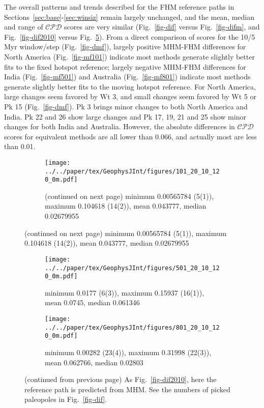 The overall patterns and trends described for the FHM reference paths in
Sections~\ref{sec:base}-\ref{sec:winsiz} remain largely unchanged, and the mean,
median and range of $\mathcal{CPD}$ scores are very similar (Fig.~\ref{fig-dif}
versus Fig.~\ref{fig-difm}, and Fig.~\ref{fig-dif2010} versus
Fig.~\ref{fig-dif2010m}). From a direct comparison of scores for the 10/5 Myr
window/step (Fig.~\ref{fig-dmf}), largely positive MHM-FHM differences for North
America (Fig.~\ref{fig-mf101}) indicate most methods generate slightly better
fits to the fixed hotspot reference; largely negative MHM-FHM differences for
India (Fig.~\ref{fig-mf501}) and Australia (Fig.~\ref{fig-mf801}) indicate most
methods generate slightly better fits to the moving hotspot reference. For North
America, large changes seem favored by Wt 3, and small changes seem favored by
Wt 5 or Pk 15 (Fig.~\ref{fig-dmf}). Pk 3 brings minor changes to both North
America and India. Pk 22 and 26 show large changes and Pk 17, 19, 21 and 25 show
minor changes for both India and Australia. However, the absolute differences in
$\mathcal{CPD}$ scores for equivalent methods are all lower than 0.066, and
actually most are less than 0.01.

\begin{figure}[!ht]
  \captionsetup[subfigure]{aboveskip=2pt,belowskip=-3pt}
  \centering
  \begin{subfigure}{1\textwidth}
    \texttt{[image: ../../paper/tex/GeophysJInt/figures/101\_20\_10\_120\_0m.pdf]}
    \caption{(continued on next page) minimum 0.00565784 (5(1)), maximum 0.104618 (14(2)),
      mean 0.043777, median 0.02679955}\label{fig-na-dif2010m}
  \end{subfigure}
\end{figure}
\begin{figure}[!ht]
  \ContinuedFloat\begin{subfigure}{1\textwidth}
    \texttt{[image: ../../paper/tex/GeophysJInt/figures/501\_20\_10\_120\_0m.pdf]}
    \caption{minimum 0.0177 (6(3)), maximum 0.15937 (16(1)), mean 0.0745,
      median 0.061346}\label{fig-in-dif2010m}
  \end{subfigure}
  \vspace{.1em}
  \begin{subfigure}{1\textwidth}
    \texttt{[image: ../../paper/tex/GeophysJInt/figures/801\_20\_10\_120\_0m.pdf]}
    \caption{minimum 0.00282 (23(4)), maximum 0.31998 (22(3)), mean
      0.062766, median 0.02803}\label{fig-au-dif2010m}
  \end{subfigure}
  \caption[$\mathcal{CPD}$ of each plate's paleomagnetic APWPs vs its MHM
    predicted APWP (20/10 Myr window/step)]{(continued from previous page) As
    Fig.~\ref{fig-dif2010}, here the reference path is predicted from MHM\@. See
    the numbers of picked paleopoles in Fig.~\ref{fig-dif}.}\label{fig-dif2010m}
\end{figure}

